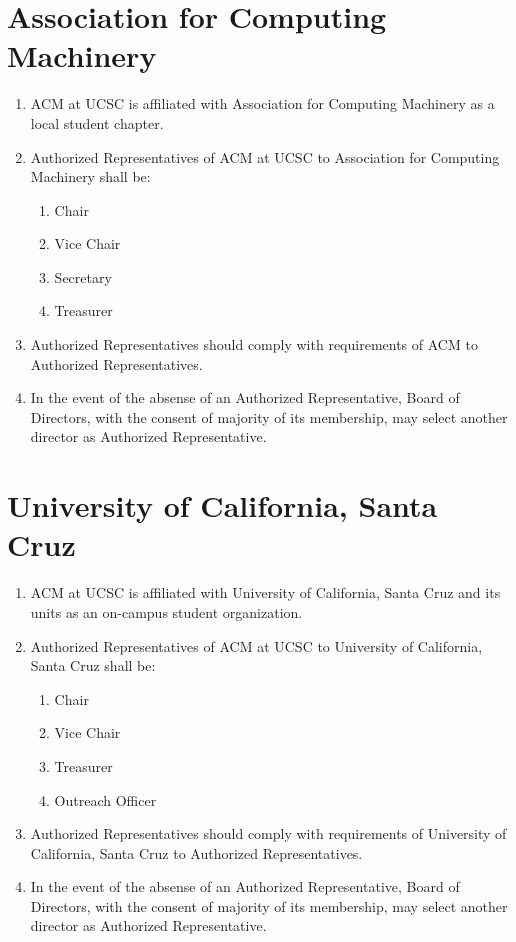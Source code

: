 
\section{Association for Computing Machinery}
\begin{enumerate}
    \item ACM at UCSC is affiliated with Association for Computing Machinery as a local student chapter.
    \item Authorized Representatives of ACM at UCSC to Association for Computing Machinery shall be:
	\begin{enumerate}
		\item Chair
		\item Vice Chair
		\item Secretary
		\item Treasurer
	\end{enumerate}
    \item Authorized Representatives should comply with requirements of ACM to Authorized Representatives.
    \item In the event of the absense of an Authorized Representative, Board of Directors, with the consent of majority of its membership, may select another director as Authorized Representative.
\end{enumerate}

\section{University of California, Santa Cruz}
\begin{enumerate}
    \item ACM at UCSC is affiliated with University of California, Santa Cruz and its units as an on-campus student organization.
    \item Authorized Representatives of ACM at UCSC to University of California, Santa Cruz shall be:
	\begin{enumerate}
		\item Chair
		\item Vice Chair
		\item Treasurer
	    \item Outreach Officer
	\end{enumerate}
    \item Authorized Representatives should comply with requirements of University of California, Santa Cruz to Authorized Representatives.
    \item In the event of the absense of an Authorized Representative, Board of Directors, with the consent of majority of its membership, may select another director as Authorized Representative.
\end{enumerate}

\newpage
